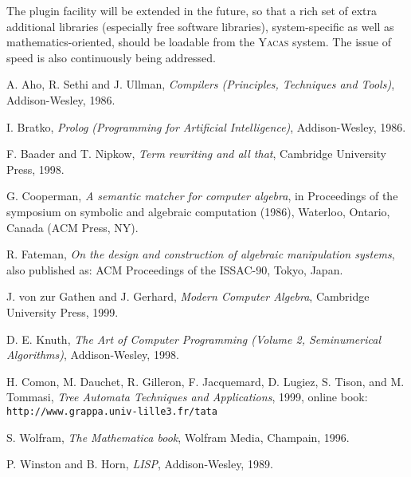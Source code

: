 \documentclass{llncs}
\begin{document}
The plugin facility will be extended in the future, so that a rich set of extra
additional libraries (especially free software libraries), system-specific as
well as mathematics-oriented, should be loadable from the \textsc{Yacas} system. The
issue of speed is also continuously being addressed. 


\begin{thebibliography}{TATW99}

 A. Aho, R. Sethi and J. Ullman, \emph{Compilers (Principles, Techniques and Tools)}, Addison-Wesley, 1986.


 I. Bratko, \emph{Prolog (Programming for Artificial Intelligence)}, Addison-Wesley, 1986.


 F. Baader and T. Nipkow, \emph{Term rewriting and all that}, Cambridge University Press, 1998.


 G. Cooperman, \emph{A semantic matcher for computer algebra}, in Proceedings of the symposium on symbolic and algebraic computation (1986), Waterloo, Ontario, Canada (ACM Press, NY).


 R. Fateman, \emph{On the design and construction of algebraic manipulation systems}, also published as: ACM Proceedings of the ISSAC-90, Tokyo, Japan.


 J. von zur Gathen and J. Gerhard, \emph{Modern Computer Algebra}, Cambridge University Press, 1999.


 D. E. Knuth, \emph{The Art of Computer Programming (Volume 2, Seminumerical Algorithms)}, Addison-Wesley, 1998.

 H. Comon, M. Dauchet, R. Gilleron, F. Jacquemard, D. Lugiez, S. Tison, and M. Tommasi, \emph{Tree Automata Techniques and Applications}, 1999, online book: {\small \verb|http://www.grappa.univ-lille3.fr/tata|}


 S. Wolfram, \emph{The Mathematica book}, Wolfram Media, Champain, 1996.


 P. Winston and B. Horn, \emph{LISP}, Addison-Wesley, 1989.


\end{thebibliography}
\end{document}
